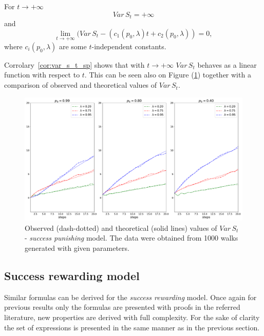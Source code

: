 \documentclass[runningheads]{CMSIM}
\begin{document}
    \begin{corollary}
        \label{cor:var_s_t_sp}For $t\rightarrow+\infty$
        \[
            Var\,S_{t}=+\infty
        \]
        and
        \[
            \lim_{t\rightarrow+\infty}(Var\,S_{t}-(c_{1}(p_{0},\lambda)t+c_{2}(p_{0},\lambda))=0,
        \]
        where $c_{i}(p_{0},\lambda)$ are some $t$-independent constants.
    \end{corollary}

    Corrolary~\ref{cor:var_s_t_sp} shows that with $t\rightarrow+\infty$
    $Var\,S_{t}$ behaves as a linear function with respect to $t$.
    This
    can be seen also on Figure (\ref{fig:var_s_t_sp}) together with a
    comparison of observed and theoretical values of $Var\,S_{t}$.

    \begin{figure}
        \includegraphics[width=1\textwidth]{../simulations/e_position_1000_walks_20_steps_type_success_punished}

        \caption{\label{fig:var_s_t_sp}Observed (dash-dotted) and theoretical (solid
        lines) values of $Var\,S_{t}$ - \emph{success punishing }model.
        The
        data were obtained from 1000 walks generated with given parameters. }

    \end{figure}

    \subsection{Success rewarding model}\label{subsec:success-rewarding-model}

    Similar formulas can be derived for the \emph{success rewarding }model.
    Once again for previous results only the formulas are presented with
    proofs in the referred literature, new properties are derived with
    full complexity.
    For the sake of clarity the set of expressions is
    presented in the same manner as in the previous section.
\end{document}
